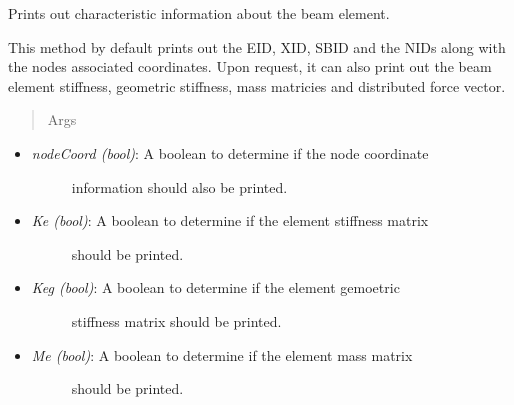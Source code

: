 \documentclass[letterpaper,10pt,english]{sphinxmanual}
\begin{document}
\begin{fulllineitems}
\begin{fulllineitems}
\begin{itemize}
\begin{description}
\end{description}

\end{itemize}

\end{fulllineitems}


\begin{fulllineitems}
\label{structures:AeroComBAT.Structures.TBeam.printSummary}
Prints out characteristic information about the beam element.

This method by default prints out the EID, XID, SBID and the NIDs along
with the nodes associated coordinates. Upon request, it can also print
out the beam element stiffness, geometric stiffness, mass matricies and
distributed force vector.
\begin{quote}\begin{description}
\item[{Args}] \leavevmode
\end{description}\end{quote}
\begin{itemize}
\item {} \begin{description}
\item[{\emph{nodeCoord (bool)}: A boolean to determine if the node coordinate}] \leavevmode
information should also be printed.

\end{description}

\item {} \begin{description}
\item[{\emph{Ke (bool)}: A boolean to determine if the element stiffness matrix}] \leavevmode
should be printed.

\end{description}

\item {} \begin{description}
\item[{\emph{Keg (bool)}: A boolean to determine if the element gemoetric}] \leavevmode
stiffness matrix should be printed.

\end{description}

\item {} \begin{description}
\item[{\emph{Me (bool)}: A boolean to determine if the element mass matrix}] \leavevmode
should be printed.


\end{description}
\end{itemize}
\end{fulllineitems}
\end{fulllineitems}
\end{document}
